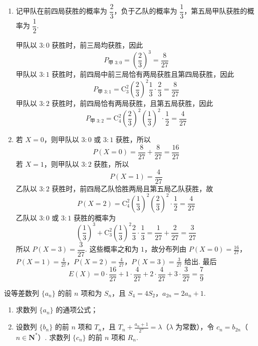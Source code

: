 \begin{solution}
\begin{enumerate}
\item
记甲队在前四局获胜的概率为 \(\dfrac23\)，负于乙队的概率为 \(\dfrac13\)，第五局甲队获胜的概率为 \(\dfrac12\).

甲队以 \(3:0\) 获胜时，前三局均获胜，因此
\[
P_{\text{甲 }3:0}=\left(\frac23\right)^3=\frac{8}{27}
\]
甲队以 \(3:1\) 获胜时，前四局中前三局恰有两局获胜且第四局获胜，因此
\[
P_{\text{甲 }3:1}
=\mathrm C_3^2\left(\frac23\right)^2\frac13\cdot\frac23
=\frac{8}{27}
\]
甲队以 \(3:2\) 获胜时，前四局恰有两局获胜，且第五局获胜，因此
\[
P_{\text{甲 }3:2}
=\mathrm C_4^2\left(\frac23\right)^2\left(\frac13\right)^2\cdot\frac12
=\frac{4}{27}
\]

\item
若 \(X=0\)，则甲队以 \(3:0\) 或 \(3:1\) 获胜，所以
\[
P(X=0)=\frac{8}{27}+\frac{8}{27}=\frac{16}{27}
\]
若 \(X=1\)，则甲队以 \(3:2\) 获胜，所以
\[
P(X=1)=\frac{4}{27}
\]
乙队以 \(3:2\) 获胜时，前四局乙队恰胜两局且第五局乙队获胜，故
\[
P(X=2)=\mathrm C_4^2\left(\frac13\right)^2\left(\frac23\right)^2\cdot\frac12
=\frac{4}{27}
\]
乙队以 \(3:0\) 或 \(3:1\) 获胜的概率为
\[
\left(\frac13\right)^3
+\mathrm C_3^2\left(\frac13\right)^2\frac23\cdot\frac13
=\frac{1}{27}+\frac{2}{27}=\frac{3}{27}
\]
所以 \(P(X=3)=\dfrac{3}{27}\). 这些概率之和为 \(1\)，故分布列由
\(P(X=0)=\frac{16}{27}\)，\(P(X=1)=\frac{4}{27}\)，\(P(X=2)=\frac{4}{27}\)，\(P(X=3)=\frac{3}{27}\)
给出. 最后
\[
E(X)=0\cdot\frac{16}{27}+1\cdot\frac{4}{27}
+2\cdot\frac{4}{27}+3\cdot\frac{3}{27}
=\frac{7}{9}
\]
\end{enumerate}
\end{solution}

\begin{problem}
设等差数列 \(\{a_{n}\}\) 的前 \(n\) 项和为 \(S_{n}\)，且 \(S_{4} = 4S_{2}\)，\(a_{2n} = 2a_{n} + 1\).
\begin{enumerate}
\item 求数列 \(\{a_{n}\}\) 的通项公式；
\item 设数列 \(\{b_{n}\}\) 的前 \(n\) 项和 \(T_{n}\)，且 \(T_{n} + \frac{a_{n} + 1}{2^n} = \lambda\)（\(\lambda\) 为常数），令 \(c_{n} = b_{2n}\)（\(n \in \mathbf{N}^*\)）. 求数列 \(\{c_{n}\}\) 的前 \(n\) 项和 \(R_{n}\).
\end{enumerate}
\end{problem}

